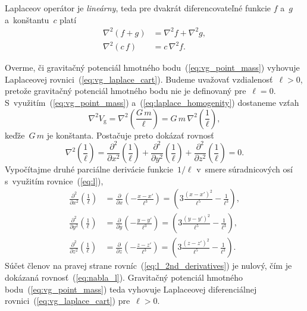 \documentclass[a4paper, 12pt]{book}
\newcommand{\gidx}{\mathrm g}
\begin{document}
Laplaceov operátor je \emph{lineárny}, teda pre dvakrát diferencovateľné 
funkcie $f$ a~$g$ a~konštantu~$c$ platí
%
\begin{align}
\label{eq:laplace_additivity}
\nabla^2 \left(f + g \right) &= \nabla^2 f + \nabla^2 g{,}\\
%
\label{eq:laplace_homogenity}
\nabla^2 (c \, f) &= c \, \nabla^2 f{.}
\end{align}

Overme, či gravitačný potenciál hmotného bodu~(\ref{eq:vg_point_mass}) vyhovuje 
Laplaceovej rovnici~(\ref{eq:vg_laplace_cart}).  Budeme uvažovať 
vzdialenosť~$\ell > 0$, pretože gravitačný potenciál hmotného bodu nie je 
definovaný pre~$\ell = 0$.  S~využitím~(\ref{eq:vg_point_mass}) 
a~(\ref{eq:laplace_homogenity}) dostaneme vzťah
%
\begin{equation}
\nabla^2 V_\gidx = \nabla^2 \left( \frac{G \, m}{\ell} \right) = G \, m \, 
\nabla^2 \left( \frac{1}{\ell} \right){,}
\end{equation}
%
keďže~$G \, m$ je konštanta.  Postačuje preto dokázať rovnosť
%
\begin{equation}
\label{eq:nabla_l}
\nabla^2 \left( \frac{1}{\ell} \right) = \frac{\partial^2}{\partial x^2}\left( 
\frac{1}{\ell} \right) + \frac{\partial^2}{\partial y^2}\left( \frac{1}{\ell} 
\right) + \frac{\partial^2}{\partial z^2}\left( \frac{1}{\ell} \right) = 0{.}
\end{equation}
%
Vypočítajme druhé parciálne derivácie funkcie~$1 \slash \ell$ v~smere 
súradnicových osí s~využitím rovnice~(\ref{eq:l}),
%
\begin{equation}
\label{eq:l_2nd_derivatives}
\begin{split}
\frac{\partial^2}{\partial x^2} \left( \frac{1}{\ell} \right) &=
\frac{\partial}{\partial x} \left( -\frac{x - x'}{\ell^3} \right) = \left(3
\frac{(x - x')^2}{\ell^5} - \frac{1}{\ell^3} \right){,}\\
%
\frac{\partial^2}{\partial y^2} \left( \frac{1}{\ell} \right) &=
\frac{\partial}{\partial y} \left( -\frac{y - y'}{\ell^3} \right) = \left(3
\frac{(y - y')^2}{\ell^5} - \frac{1}{\ell^3} \right){,}\\
%
\frac{\partial^2}{\partial z^2} \left( \frac{1}{\ell} \right) &=
\frac{\partial}{\partial z} \left( -\frac{z - z'}{\ell^3} \right) = \left(3
\frac{(z - z')^2}{\ell^5} - \frac{1}{\ell^3} \right){.}
\end{split}
\end{equation}
%
Súčet členov na pravej strane rovníc~(\ref{eq:l_2nd_derivatives}) je nulový, 
čím je dokázaná rovnosť~(\ref{eq:nabla_l}).  Gravitačný potenciál hmotného 
bodu~(\ref{eq:vg_point_mass}) teda vyhovuje Laplaceovej diferenciálnej 
rovnici~(\ref{eq:vg_laplace_cart}) pre~$\ell > 0$.
\end{document}
